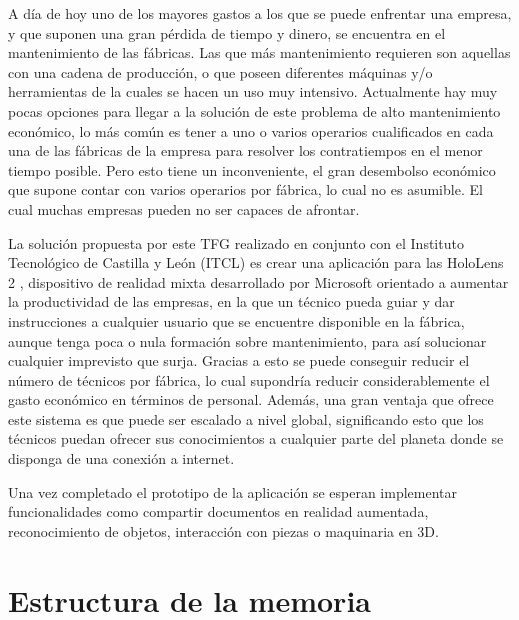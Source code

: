
A día de hoy uno de los mayores gastos a los que se puede enfrentar una empresa, y que suponen una gran pérdida de tiempo y dinero, se encuentra en el mantenimiento de las fábricas. Las que más mantenimiento requieren son aquellas con una cadena de producción, o que poseen diferentes máquinas y/o herramientas de la cuales se hacen un uso muy intensivo. Actualmente hay muy pocas opciones para llegar a la solución de este problema de alto mantenimiento económico, lo más común es tener a uno o varios operarios cualificados en cada una de las fábricas de la empresa para resolver los contratiempos en el menor tiempo posible. Pero esto tiene un inconveniente, el gran desembolso económico que supone contar con varios operarios por fábrica, lo cual no es asumible. El cual muchas empresas pueden no ser capaces de afrontar.

La solución propuesta por este TFG realizado en conjunto con el Instituto Tecnológico de Castilla y León (ITCL) \cite{itcl:latex} es crear una aplicación para las HoloLens 2 \cite{microsoft:hololens2}, dispositivo de realidad mixta desarrollado por Microsoft orientado a aumentar la productividad de las empresas, en la que un técnico pueda guiar y dar instrucciones a cualquier usuario que se encuentre disponible en la fábrica, aunque tenga poca o nula formación sobre mantenimiento, para así solucionar cualquier imprevisto que surja. Gracias a esto se puede conseguir reducir el número de técnicos por fábrica, lo cual supondría reducir considerablemente el gasto económico en términos de personal. Además, una gran ventaja que ofrece este sistema es que puede ser escalado a nivel global, significando esto que los técnicos puedan ofrecer sus conocimientos a cualquier parte del planeta donde se disponga de una conexión a internet.

Una vez completado el prototipo de la aplicación se esperan implementar funcionalidades como compartir documentos en realidad aumentada, reconocimiento de objetos, interacción con piezas o maquinaria en 3D.

\section{Estructura de la memoria}


